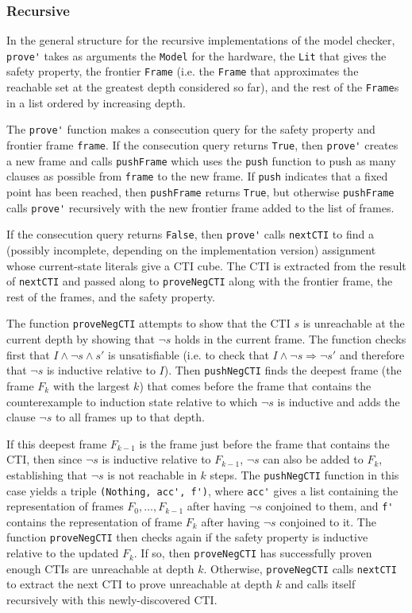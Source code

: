 \documentclass[12pt,a4paper,twoside,openright]{report}
\begin{document}
{\subsubsection{Recursive}
In the general structure for the recursive implementations of the model checker,
\verb,prove', takes as arguments the \verb,Model, for the hardware, the
\verb,Lit, that gives the safety property, the frontier \verb,Frame, 
(i.e. the \verb,Frame, that approximates the reachable set at the greatest
depth considered so far), and the rest of the \verb,Frame,s in a list ordered by
increasing depth.

The \verb,prove', function makes a consecution query for the safety property and frontier
frame \verb,frame,. If the consecution query returns \verb,True,, then \verb,prove',
creates a new frame and calls \verb,pushFrame, which uses the \verb,push, function to
push as many clauses as possible from \verb,frame, to the new frame. If \verb,push,
indicates that a fixed point has been reached, then \verb,pushFrame, returns \verb,True,,
but otherwise \verb,pushFrame, calls \verb,prove', recursively with the new frontier
frame added to the list of frames.

If the consecution query returns \verb,False,, then \verb,prove', calls \verb,nextCTI,
to find a (possibly incomplete, depending on the implementation version)
assignment whose current-state literals give a CTI cube.
The CTI is extracted from the result of \verb,nextCTI, and passed along to \verb,proveNegCTI,
along with the frontier frame, the rest of the frames, and the safety property.

The function \verb,proveNegCTI, attempts to show that the CTI
$s$ is unreachable at the current depth by showing that $\neg s$ holds in the current frame.
The function checks first that $I \wedge \neg s \wedge s'$ is unsatisfiable
(i.e. to check that $I \wedge \neg s \Rightarrow \neg s'$ and therefore that $\neg s$ is
inductive relative to $I$). Then \verb,pushNegCTI, finds the deepest frame (the frame
$F_k$ with the largest $k$) that comes before the frame that contains the counterexample to
induction state relative to which $\neg s$ is inductive and adds the clause
$\neg s$ to all frames up to that depth.

If this deepest frame $F_{k - 1}$ is the frame just before the frame that contains the
CTI, then since $\neg s$ is inductive relative to $F_{k - 1}$, $\neg s$ can also be added
to $F_k$, establishing that $\neg s$ is not reachable in $k$ steps. The \verb,pushNegCTI,
function in this case yields a triple \verb:(Nothing, acc', f'):, where \verb,acc', gives
a list containing the representation of frames $F_0, \ldots, F_{k - 1}$ after having $\neg s$
conjoined to them, and \verb,f', contains the representation of frame $F_k$ after having
$\neg s$ conjoined to it. The function \verb,proveNegCTI, then checks again if the safety
property is inductive relative to the updated $F_k$. If so, then \verb,proveNegCTI, has
successfully proven enough CTIs are unreachable at depth $k$. Otherwise, \verb,proveNegCTI,
calls \verb,nextCTI, to extract the next CTI to prove unreachable at depth $k$ and calls
itself recursively with this newly-discovered CTI.

}
\end{document}
